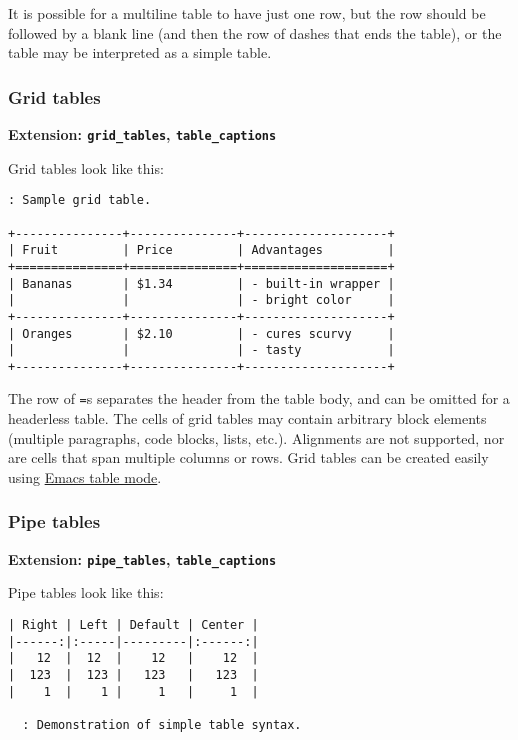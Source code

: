 \documentclass[]{article}
\begin{document}
It is possible for a multiline table to have just one row, but the row
should be followed by a blank line (and then the row of dashes that ends
the table), or the table may be interpreted as a simple table.

\subsubsection{Grid tables}\label{grid-tables}

\textbf{Extension: \texttt{grid\_tables}, \texttt{table\_captions}}

Grid tables look like this:

\begin{verbatim}
: Sample grid table.

+---------------+---------------+--------------------+
| Fruit         | Price         | Advantages         |
+===============+===============+====================+
| Bananas       | $1.34         | - built-in wrapper |
|               |               | - bright color     |
+---------------+---------------+--------------------+
| Oranges       | $2.10         | - cures scurvy     |
|               |               | - tasty            |
+---------------+---------------+--------------------+
\end{verbatim}

The row of \texttt{=}s separates the header from the table body, and can
be omitted for a headerless table. The cells of grid tables may contain
arbitrary block elements (multiple paragraphs, code blocks, lists,
etc.). Alignments are not supported, nor are cells that span multiple
columns or rows. Grid tables can be created easily using
\href{http://table.sourceforge.net/}{Emacs table mode}.

\subsubsection{Pipe tables}\label{pipe-tables}

\textbf{Extension: \texttt{pipe\_tables}, \texttt{table\_captions}}

Pipe tables look like this:

\begin{verbatim}
| Right | Left | Default | Center |
|------:|:-----|---------|:------:|
|   12  |  12  |    12   |    12  |
|  123  |  123 |   123   |   123  |
|    1  |    1 |     1   |     1  |

  : Demonstration of simple table syntax.
\end{verbatim}
\end{document}
